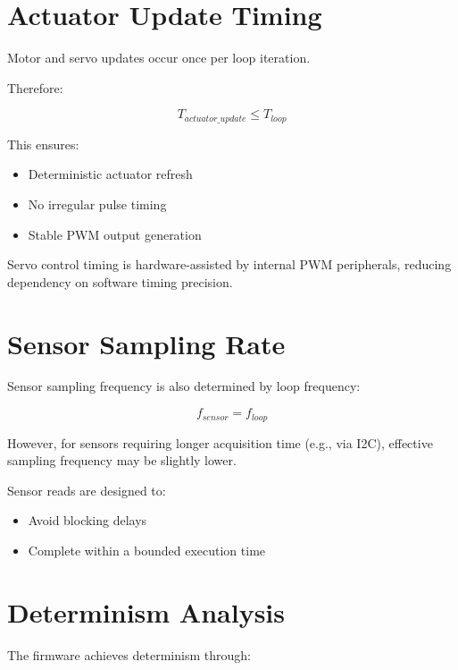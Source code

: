 
\section{Actuator Update Timing}

Motor and servo updates occur once per loop iteration.

Therefore:

\[
T_{actuator\_update} \leq T_{loop}
\]

This ensures:

\begin{itemize}
	\item Deterministic actuator refresh
	\item No irregular pulse timing
	\item Stable PWM output generation
\end{itemize}

Servo control timing is hardware-assisted by internal PWM peripherals, 
reducing dependency on software timing precision.


\section{Sensor Sampling Rate}

Sensor sampling frequency is also determined by loop frequency:

\[
f_{sensor} = f_{loop}
\]

However, for sensors requiring longer acquisition time (e.g., via I2C), 
effective sampling frequency may be slightly lower.

Sensor reads are designed to:

\begin{itemize}
	\item Avoid blocking delays
	\item Complete within a bounded execution time
\end{itemize}


\section{Determinism Analysis}

The firmware achieves determinism through:

